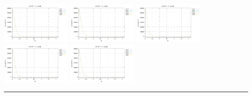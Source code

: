 \noindent
\includegraphics[width=3.5cm]{python_codes/fieldstone_152/RESULTS/exp2/qqq_64_m2}
\includegraphics[width=3.5cm]{python_codes/fieldstone_152/RESULTS/exp2/qqq_64_m3}
\includegraphics[width=3.5cm]{python_codes/fieldstone_152/RESULTS/exp2/qqq_64_m4}
\includegraphics[width=3.5cm]{python_codes/fieldstone_152/RESULTS/exp2/qqq_64_m5}
\includegraphics[width=3.5cm]{python_codes/fieldstone_152/RESULTS/exp2/qqq_64_m6}

\hrule

